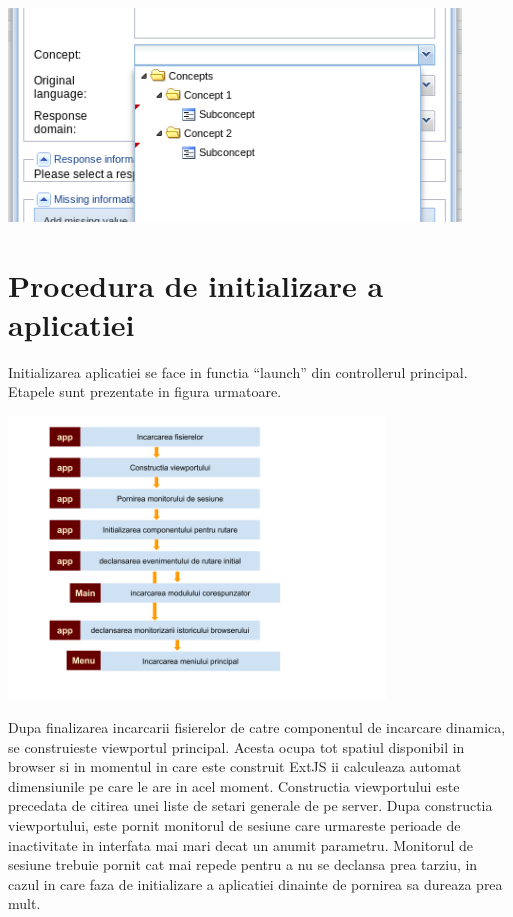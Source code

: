 \includegraphics[width=12cm]{img/treecombo}


\section{Procedura de initializare a aplicatiei}

Initializarea aplicatiei se face in functia “launch” din controllerul principal. Etapele sunt prezentate in figura urmatoare.


\includegraphics[width=10cm]{img/app-launch}

Dupa finalizarea incarcarii fisierelor de catre componentul de incarcare dinamica, se construieste viewportul principal. Acesta ocupa tot spatiul disponibil in browser si in momentul in care este construit ExtJS ii calculeaza automat dimensiunile pe care le are in acel moment. Constructia viewportului este precedata de citirea unei liste de setari generale de pe server. Dupa constructia viewportului, este pornit monitorul de sesiune care urmareste perioade de inactivitate in interfata mai mari decat un anumit parametru. Monitorul de sesiune trebuie pornit cat mai repede pentru a nu se declansa prea tarziu, in cazul in care faza de initializare a aplicatiei dinainte de pornirea sa dureaza prea mult. 

